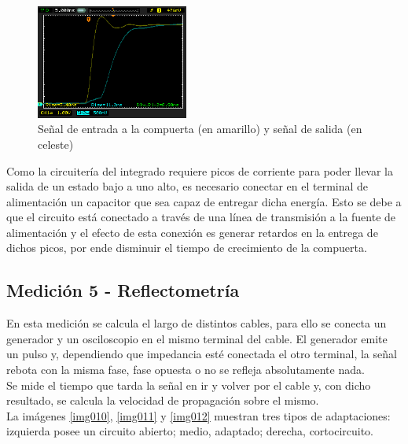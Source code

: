 \documentclass[a4paper,10pt]{article}
\begin{document}
		\begin{figure}[!htb]
			\centering
			\includegraphics[width=5cm]
			{Imagenes/Risetime3.png}
			\caption{Se\~nal de entrada a la compuerta (en amarillo) y se\~nal 
			de salida (en celeste)}
			\label{img009}
		\end{figure}
	\indent Como la circuitería del integrado requiere picos de corriente para 
	poder llevar la salida de un estado bajo a uno alto, es necesario conectar 
	en el terminal de alimentación un capacitor que sea capaz de entregar dicha 
	energía. Esto se debe a que el circuito está conectado a través de una línea
	de transmisión a la fuente de alimentación y el efecto de esta conexión es 
	generar retardos en la entrega de dichos picos, por ende disminuir el tiempo
	de crecimiento de la compuerta.
	
	\subsection{Medición 5 - Reflectometría}
	\indent En esta medición se calcula el largo de distintos cables, para ello
	se conecta un generador y un osciloscopio en el mismo terminal del cable. El
	generador emite un pulso y, dependiendo que impedancia esté conectada el 
	otro terminal, la señal rebota con la misma fase, fase opuesta o no se 
	refleja absolutamente nada. \\
	\indent Se mide el tiempo que tarda la señal en ir y volver por el cable y,
	con dicho resultado, se calcula la velocidad de propagación sobre el mismo.
	\\
	\indent La imágenes \ref{img010}, \ref{img011} y \ref{img012} muestran tres
	tipos de adaptaciones: izquierda posee un circuito abierto; medio, adaptado;
	derecha, cortocircuito. \\
\end{document}
